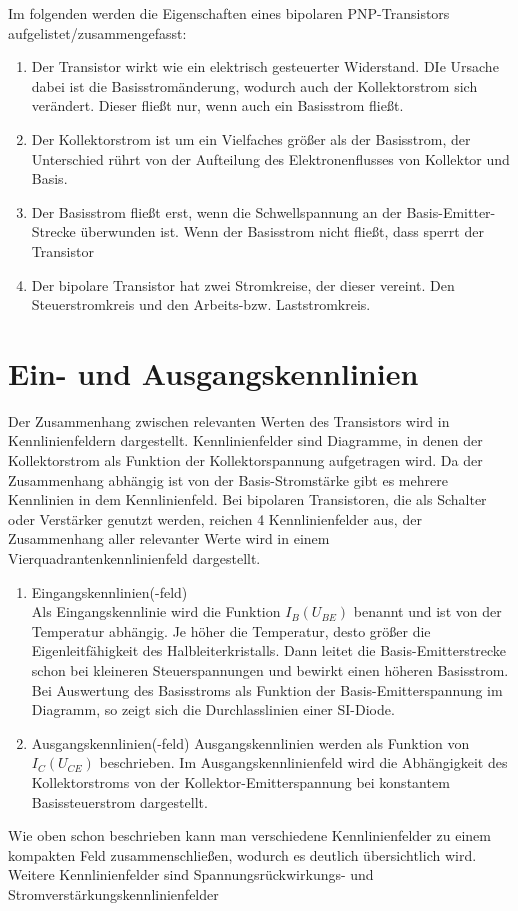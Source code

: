 Im folgenden werden die Eigenschaften eines bipolaren PNP-Transistors
aufgelistet/zusammengefasst:
\begin{enumerate} 
\item Der Transistor wirkt wie ein elektrisch gesteuerter Widerstand. DIe Ursache dabei ist die
Basisstromänderung, wodurch auch der Kollektorstrom sich verändert. Dieser fließt nur,
wenn auch ein Basisstrom fließt.
\item Der Kollektorstrom ist um ein Vielfaches größer als der Basisstrom, der Unterschied
rührt von der Aufteilung des Elektronenflusses von Kollektor und Basis.
\item Der Basisstrom fließt erst, wenn die Schwellspannung an der Basis-Emitter-Strecke
überwunden ist. Wenn der Basisstrom nicht fließt, dass sperrt der Transistor
\item Der bipolare Transistor hat zwei Stromkreise, der dieser vereint. Den Steuerstromkreis
und den Arbeits-bzw. Laststromkreis.
\end{enumerate}
\section{Ein- und Ausgangskennlinien}
Der Zusammenhang zwischen relevanten Werten des Transistors wird in Kennlinienfeldern dargestellt. 
Kennlinienfelder sind Diagramme, in denen der Kollektorstrom als Funktion der Kollektorspannung aufgetragen wird. Da der Zusammenhang abhängig ist von der Basis-Stromstärke
gibt es mehrere Kennlinien in dem Kennlinienfeld. Bei bipolaren Transistoren, die als Schalter oder Verstärker genutzt werden, reichen 4 Kennlinienfelder aus, der Zusammenhang aller relevanter Werte wird in einem Vierquadrantenkennlinienfeld dargestellt. \\
\begin{enumerate} 
\item Eingangskennlinien(-feld)\\
Als Eingangskennlinie wird die Funktion $I_B(U_{BE})$ benannt und ist von der Temperatur abhängig. Je höher die Temperatur, desto  größer die Eigenleitfähigkeit des Halbleiterkristalls. Dann leitet die Basis-Emitterstrecke schon bei kleineren Steuerspannungen und bewirkt einen höheren Basisstrom. \\
Bei Auswertung des Basisstroms als Funktion der Basis-Emitterspannung im Diagramm, so zeigt sich die Durchlasslinien einer SI-Diode. 
\item Ausgangskennlinien(-feld)
Ausgangskennlinien werden als Funktion von $I_C(U_{CE})$ beschrieben. Im Ausgangskennlinienfeld wird die Abhängigkeit des Kollektorstroms von der Kollektor-Emitterspannung bei konstantem Basissteuerstrom dargestellt. 
\end{enumerate}
Wie oben schon beschrieben kann man verschiedene Kennlinienfelder zu einem kompakten Feld zusammenschließen, wodurch es deutlich übersichtlich wird. Weitere Kennlinienfelder sind Spannungsrückwirkungs- und Stromverstärkungskennlinienfelder
